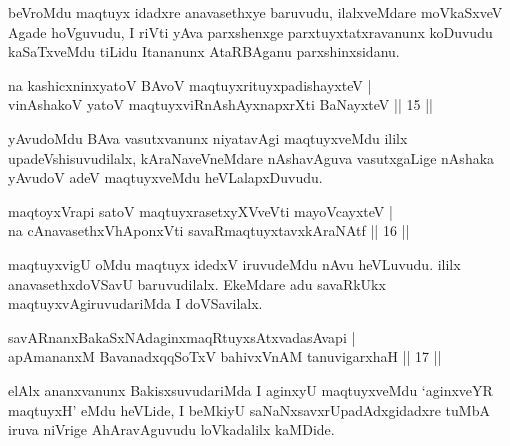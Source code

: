 \begin{artha}
beVroMdu maqtuyx idadxre anavasethxye baruvudu, ilalxveMdare moVkaSxveV Agade hoVguvudu, I riVti yAva parxshenxge parxtuyxtatxravanunx koDuvudu kaSaTxveMdu tiLidu Itananunx AtaRBAganu parxshinxsidanu.
\end{artha}




\begin{shl}
na kashicxninxyatoV BAvoV maqtuyxrituyxpadishayxteV |\\
vinAshakoV yatoV maqtuyxviRnAshAyxnapxrXti BaNayxteV \hfill || 15 ||
\end{shl}

\begin{artha}
yAvudoMdu BAva vasutxvanunx niyatavAgi maqtuyxveMdu ililx upadeVshisuvudilalx, 
kAraNaveVneMdare nAshavAguva vasutxgaLige nAshaka yAvudoV adeV maqtuyxveMdu heVLalapxDuvudu.
\end{artha}


\begin{shl}
maqtoyxVrapi satoV maqtuyxrasetxyXVveVti mayoVcayxteV |\\
na cAnavasethxVhA\s \s ponxVti savaRmaqtuyxtavxkAraNAtf \hfill || 16 ||
\end{shl}

\begin{artha}
maqtuyxvigU oMdu maqtuyx idedxV iruvudeMdu nAvu heVLuvudu. ililx anavasethxdoVSavU 
baruvudilalx. EkeMdare adu savaRkUkx maqtuyxvAgiruvudariMda I doVSavilalx.
\end{artha}

\begin{shl}
savARnanxBakaSxNAdaginxmaqRtuyxsAtxvadasAvapi |\\
apAmananxM BavanadxqqSoTxV bahivxVnAM tanuvigarxhaH \hfill || 17 ||
\end{shl}

\begin{artha}
elAlx ananxvanunx BakisxsuvudariMda I aginxyU maqtuyxveMdu `aginxveYR maqtuyxH'  eMdu heVLide, I 
beMkiyU saNaNxsavxrUpadAdxgidadxre tuMbA iruva niVrige AhAravAguvudu loVkadalilx kaMDide.
\end{artha}

